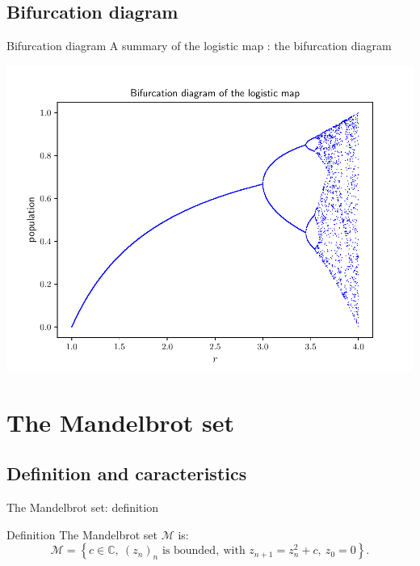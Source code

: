 \documentclass[11pt, compress,tikz]{beamer}
\theoremstyle{definition}
\begin{document}
\subsection{Bifurcation diagram}
\begin{frame}{Bifurcation diagram}
A summary of the logistic map : the bifurcation diagram
\begin{center}
    \includegraphics[scale=0.6]{bifurcation.pdf}
\end{center}
\end{frame}



\section[Mandelbrot]{The Mandelbrot set}
\subsection{Definition and caracteristics}
\begin{frame}{The Mandelbrot set: definition}

\begin{block}{Definition}
The Mandelbrot set $\mathcal{M}$ is:
$$\mathcal{M}=\left\{ c\in\mathbb{C},\ (z_n)_n \text{ is bounded},\ \text{with } z_{n+1}=z_n^2+c,\ z_0=0\right\}.$$
\end{block}

\end{frame}
\end{document}
